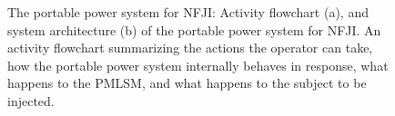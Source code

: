     \begin{figure}
        \centering
            \qquad
        \caption{The portable power system for NFJI: Activity flowchart (a), and system architecture (b) of the portable power system for NFJI. An activity flowchart summarizing the actions the operator can take, how the portable power system internally behaves in response, what happens to the PMLSM, and what happens to the subject to be injected.}
        \label{fig:system_overview}
    \end{figure}



